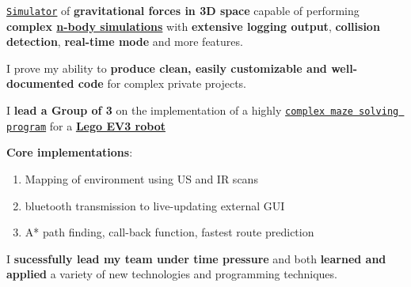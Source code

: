 \documentclass[]{jonas-cv}
\begin{document}
\begin{minipage}[t]{0.63\textwidth}
\begin{tightemize}
    \item \href{https://github.com/j0ner0n/PhysicsSim}{\texttt{Simulator}} of \textbf{gravitational forces in 3D space} capable of performing \textbf{complex \href{https://en.wikipedia.org/wiki/N-body_problem}{n-body simulations}} with \textbf{extensive logging output}, \textbf{collision detection}, \textbf{real-time mode} and more features.
    \item[\faicon{angle-double-right}] I prove my ability to \textbf{produce clean, easily customizable and well-documented code} for complex private projects.
\end{tightemize}
\largesectionsep


\begin{tightemize}
    \item I \textbf{lead a Group of 3} on the implementation of a highly \href{https://github.com/j0ner0n/University-Assignments/Year1}{\texttt{complex maze solving program}} for a \href{https://education.lego.com/en-gb/product/mindstorms-ev3}{\textbf{Lego EV3 robot}}
   \item \textbf{Core implementations}: 
   \begin{enumerate}
        \item Mapping of environment using US and IR scans
        \item bluetooth transmission to live-updating external GUI
        \item A* path finding, call-back function, fastest route prediction
   \end{enumerate}
   \vspace{1mm}

   \item[\faicon{angle-double-right}] I \textbf{sucessfully lead my team under time pressure} and both \textbf{learned and applied} a variety of new technologies and programming techniques.
\end{tightemize}



\end{minipage}
\end{document}
